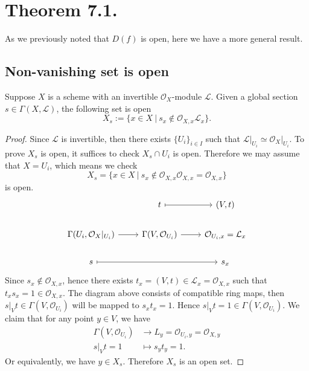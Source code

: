 \section{Theorem 7.1.}

As we previously noted that $D(f)$ is open, here we have a more general result. 
\subsection*{Non-vanishing set is open}
\begin{proposition}
    Suppose $X$ is a scheme with an invertible $\mathcal O_X$-module $\mathcal L$. Given a global section $s\in\Gamma(X,\mathcal L)$, the following set is open
    \[X_s:=\{x\in X ~\vert~ s_x \notin \mathcal O_{X,x}\mathcal L_x\}.\]
\end{proposition}
\begin{proof}
    Since $\mathcal L$ is invertible, then there exists $\{U_i\}_{i\in I}$ such that $\mathcal L\vert_{U_i}\simeq \mathcal O_{X}\vert_{U_i}$. To prove $X_s$ is open, it suffices to check $X_s\cap U_i$ is open. Therefore we may assume that $X=U_i$, which means we check 
    \[X_s=\{x\in X~\vert~ s_x\notin \mathcal O_{X,x}\mathcal O_{X,x}=\mathcal O_{X,x}\}\] is open. 
    \[%
    \begin{tikzcd}
                                                     & t \arrow[r, maps to]                   & {(V,t)}                           \\
    {\Gamma(U_i,\mathcal O_X \vert_{U_i})} \arrow[r] & {\Gamma(V,\mathcal O_{U_i})} \arrow[r] & {\mathcal O_{U_i,x}=\mathcal L_x} \\
    s \arrow[rr, maps to]                            &                                        & s_x                              
    \end{tikzcd}\]
    Since $s_x\notin \mathcal O_{X,x}$, hence there exists $t_x=(V,t)\in \mathcal L_x=\mathcal O_{X,x}$ such that $t_xs_x=1\in\mathcal O_{X,x}$. The diagram above consists of compatible ring maps, then $s\vert_V t \in \Gamma(V,\mathcal O_{U_i})$ will be mapped to $s_xt_x=1$. Hence $s\vert_V t=1\in \Gamma(V,\mathcal O_{U_i})$. 
    We claim that for any point $y\in V$, we have \begin{align*}
        \Gamma(V,\mathcal O_{U_i}) &\to L_y=\mathcal O_{U_i,y}=\mathcal O_{X,y}\\
        s\vert_V t =1 &\mapsto s_yt_y=1.
    \end{align*}
    Or equivalently, we have $y\in X_s$. Therefore $X_s$ is an open set. 
\end{proof}
